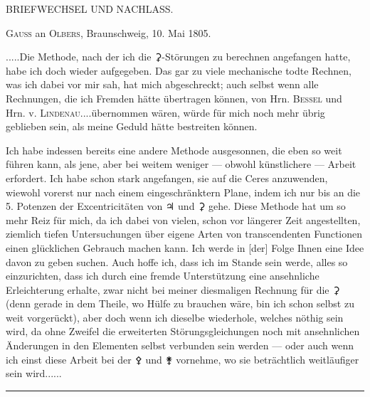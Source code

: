 \clearpage
{}
\begin{center}
{\large BRIEFWECHSEL UND NACHLASS.\par}
\par
[MAI—JULI 1805.]\par
\bigskip
[1.]\par
\medskip
\textsc{Gauss} an \textsc{Olbers}, Braunschweig, 10. Mai 1805.
\end{center}
\noindent\hspace*{\parindent}.\quad.\quad.\quad.\quad.\quad Die Methode, nach der ich die {\AstroSymbols ⚳}-Störungen zu berechnen angefangen hatte, habe ich doch wieder aufgegeben. Das gar zu viele mechanische todte Rechnen, was ich dabei vor mir sah, hat mich abgeschreckt; auch selbst wenn alle Rechnungen, die ich Fremden hätte übertragen können, von Hrn. \textsc{Bessel} und Hrn. v. \textsc{Lindenau}\quad.\quad.\quad.\quad.\quad übernommen wären, würde für mich noch mehr übrig geblieben sein, als meine Geduld hätte bestreiten können.

Ich habe indessen bereits eine andere Methode ausgesonnen, die eben so weit führen kann, als jene, aber bei weitem weniger — obwohl künstlichere — Arbeit erfordert. Ich habe schon stark angefangen, sie auf die Ceres anzuwenden, wiewohl vorerst nur nach einem eingeschränktern Plane, indem ich nur bis an die 5. Potenzen der Excentricitäten von {\AstroSymbols ♃} und {\AstroSymbols ⚳} gehe. Diese Methode hat um so mehr Reiz für mich, da ich dabei von vielen, schon vor längerer Zeit angestellten, ziemlich tiefen Untersuchungen über eigene Arten von transcendenten Functionen einen glücklichen Gebrauch machen kann. Ich werde in [der] Folge Ihnen eine Idee davon zu geben suchen. Auch hoffe ich, dass ich im Stande sein werde, alles so einzurichten, dass ich durch eine fremde Unterstützung eine ansehnliche Erleichterung erhalte, zwar nicht bei meiner diesmaligen Rechnung für die {\AstroSymbols ⚳} (denn gerade in dem Theile, wo Hülfe zu brauchen wäre, bin ich schon selbst zu weit vorgerückt), aber doch wenn ich dieselbe wiederhole, welches nöthig sein wird, da ohne Zweifel die erweiterten Störungsgleichungen noch mit ansehnlichen Änderungen in den Elementen selbst verbunden sein werden — oder auch wenn ich einst diese Arbeit bei der {\AstroSymbols ⚴} und {\AstroSymbols ⚵} vornehme, wo sie beträchtlich weitläufiger sein wird.\quad.\quad.\quad.\quad.\quad.
\par\medskip
\begin{center}\rule{.30\linewidth}{.4pt}\end{center}
